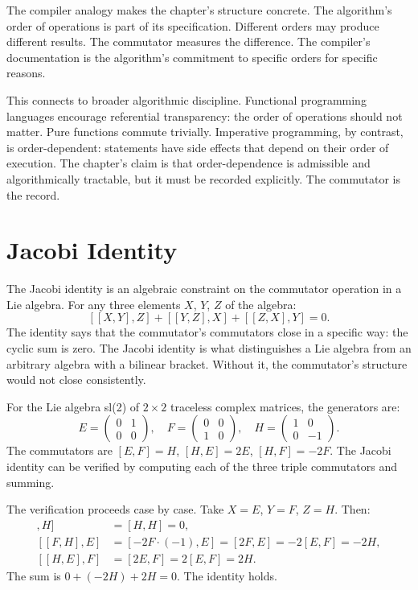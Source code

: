 The compiler analogy makes the chapter's structure concrete. The
algorithm's order of operations is part of its specification.
Different orders may produce different results. The commutator
measures the difference. The compiler's documentation is the
algorithm's commitment to specific orders for specific reasons.

This connects to broader algorithmic discipline. Functional
programming languages encourage referential transparency: the order
of operations should not matter. Pure functions commute trivially.
Imperative programming, by contrast, is order-dependent: statements
have side effects that depend on their order of execution. The
chapter's claim is that order-dependence is admissible and
algorithmically tractable, but it must be recorded explicitly. The
commutator is the record.

\section{Jacobi Identity}
\label{se:jacobi-identity}

The Jacobi identity is an algebraic constraint on the commutator
operation in a Lie algebra. For any three elements $X$, $Y$, $Z$ of
the algebra:
\[
[[X, Y], Z] + [[Y, Z], X] + [[Z, X], Y] = 0.
\]
The identity says that the commutator's commutators close in a
specific way: the cyclic sum is zero. The Jacobi identity is what
distinguishes a Lie algebra from an arbitrary algebra with a
bilinear bracket. Without it, the commutator's structure would not
close consistently.

For the Lie algebra sl(2) of $2 \times 2$ traceless complex
matrices, the generators are:
\[
E = \begin{pmatrix} 0 & 1 \\ 0 & 0 \end{pmatrix}, \quad
F = \begin{pmatrix} 0 & 0 \\ 1 & 0 \end{pmatrix}, \quad
H = \begin{pmatrix} 1 & 0 \\ 0 & -1 \end{pmatrix}.
\]
The commutators are $[E, F] = H$, $[H, E] = 2E$, $[H, F] = -2F$.
The Jacobi identity can be verified by computing each of the
three triple commutators and summing.

The verification proceeds case by case. Take $X = E$, $Y = F$, $Z =
H$. Then:
\begin{align*}
[[E, F], H] &= [H, H] = 0, \\
[[F, H], E] &= [-2F \cdot (-1), E] = [2F, E] = -2 [E, F] = -2H, \\
[[H, E], F] &= [2E, F] = 2[E, F] = 2H.
\end{align*}
The sum is $0 + (-2H) + 2H = 0$. The identity holds.

